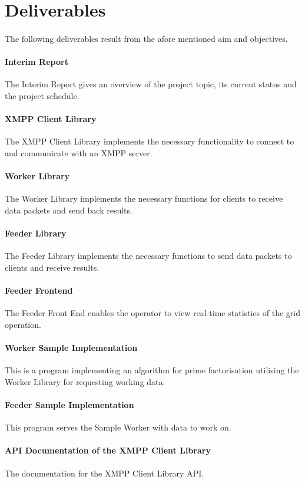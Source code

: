 \section{Deliverables}
\paragraph{}
The following deliverables result from the afore mentioned aim and objectives.

\paragraph{Interim Report} The Interim Report gives an overview of the project topic, its current status and the project schedule.
\paragraph{XMPP Client Library} The XMPP Client Library implements the necessary functionality to connect to and communicate with an XMPP server.
\paragraph{Worker Library} The Worker Library implements the necessary functions for clients to receive data packets and send back results.
\paragraph{Feeder Library} The Feeder Library implements the necessary functions to send data packets to clients and receive results.
\paragraph{Feeder Frontend} The Feeder Front End enables the operator to view real-time statistics of the grid operation.
\paragraph{Worker Sample Implementation} This is a program implementing an algorithm for prime factorisation utilising the Worker Library for requesting working data.
\paragraph{Feeder Sample Implementation} This program serves the Sample Wor\-ker with data to work on.
\paragraph{API Documentation of the XMPP Client Library} The documentation for the XMPP Client Library API.
